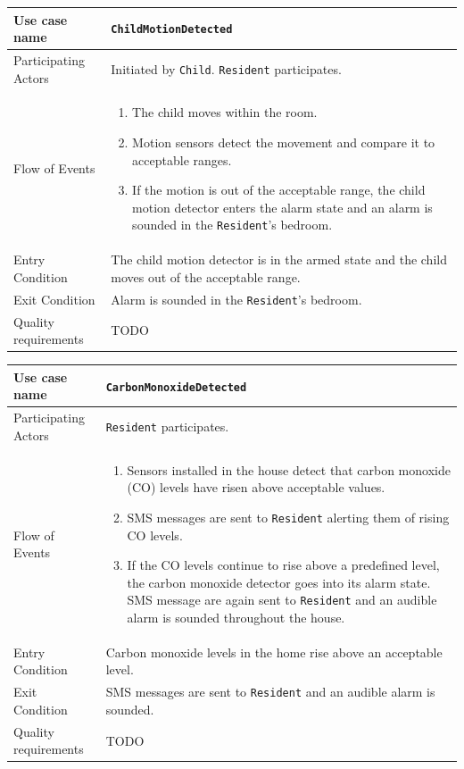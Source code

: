 \documentclass{report}
\begin{document}
\begin{tabular}{| l | p{12cm} |}
\hline
Use case name & \texttt{ChildMotionDetected} \\ \hline
Participating Actors & Initiated by \texttt{Child}. \texttt{Resident} participates. \\ \hline
Flow of Events & 

\begin{enumerate}
 \item The child moves within the room.
 \item Motion sensors detect the movement and compare it to acceptable ranges.
 \item If the motion is out of the acceptable range, the child motion
       detector enters the alarm state and an alarm is sounded in the
       \texttt{Resident}'s bedroom.
\end{enumerate}

\\ \hline

Entry Condition & The child motion detector is in the armed state and the child moves
                  out of the acceptable range. \\ \hline
Exit Condition & Alarm is sounded in the \texttt{Resident}'s bedroom. \\ \hline
Quality requirements & TODO \\ \hline

\hline
\end{tabular}

\begin{tabular}{| l | p{12cm} |}
\hline
Use case name & \texttt{CarbonMonoxideDetected} \\ \hline
Participating Actors & \texttt{Resident} participates. \\ \hline
Flow of Events & 

\begin{enumerate}
 \item Sensors installed in the house detect that carbon monoxide (CO) levels have
       risen above acceptable values.
 \item SMS messages are sent to \texttt{Resident} alerting them of rising CO levels.
 \item If the CO levels continue to rise above a predefined level, the carbon monoxide
       detector goes into its alarm state. SMS message are again sent to \texttt{Resident}
       and an audible alarm is sounded throughout the house.
\end{enumerate}

\\ \hline

Entry Condition & Carbon monoxide levels in the home rise above an acceptable level. \\ \hline
Exit Condition & SMS messages are sent to \texttt{Resident} and an audible
                 alarm is sounded. \\ \hline
Quality requirements & TODO \\ \hline

\hline
\end{tabular}
\end{document}
